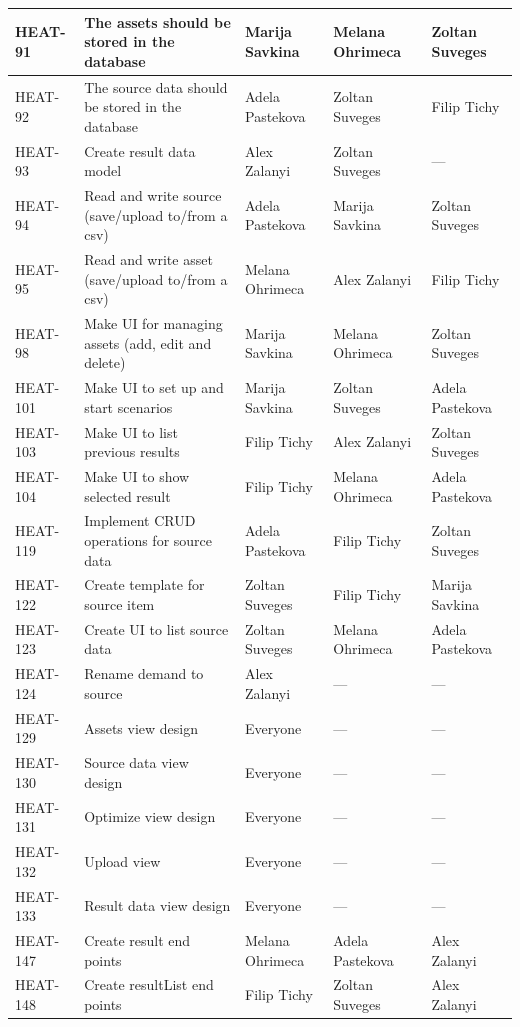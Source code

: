 \begin{longtable}{|p{1.5cm}|p{4.5cm}|p{2.8cm}|p{2.6cm}|p{2.6cm}|}
HEAT-91 & The assets should be stored in the database & Marija Savkina & Melana Ohrimeca & Zoltan Suveges \\ \hline
HEAT-92 & The source data should be stored in the database & Adela Pastekova & Zoltan Suveges & Filip Tichy \\ \hline
HEAT-93 & Create result data model & Alex Zalanyi & Zoltan Suveges & --- \\ \hline
HEAT-94 & Read and write source (save/upload to/from a csv) & Adela Pastekova & Marija Savkina & Zoltan Suveges \\ \hline
HEAT-95 & Read and write asset (save/upload to/from a csv) & Melana Ohrimeca & Alex Zalanyi & Filip Tichy \\ \hline
HEAT-98 & Make UI for managing assets (add, edit and delete) & Marija Savkina & Melana Ohrimeca & Zoltan Suveges \\ \hline
HEAT-101 & Make UI to set up and start scenarios & Marija Savkina & Zoltan Suveges & Adela Pastekova \\ \hline
HEAT-103 & Make UI to list previous results & Filip Tichy & Alex Zalanyi & Zoltan Suveges \\ \hline
HEAT-104 & Make UI to show selected result & Filip Tichy & Melana Ohrimeca & Adela Pastekova \\ \hline
HEAT-119 & Implement CRUD operations for source data & Adela Pastekova & Filip Tichy & Zoltan Suveges \\ \hline
HEAT-122 & Create template for source item & Zoltan Suveges & Filip Tichy & Marija Savkina \\ \hline
HEAT-123 & Create UI to list source data & Zoltan Suveges & Melana Ohrimeca & Adela Pastekova \\ \hline
HEAT-124 & Rename demand to source & Alex Zalanyi & --- & --- \\ \hline
HEAT-129 & Assets view design & Everyone & --- & --- \\ \hline
HEAT-130 & Source data view design & Everyone & --- & --- \\ \hline
HEAT-131 & Optimize view design & Everyone & --- & --- \\ \hline
HEAT-132 & Upload view & Everyone & --- & --- \\ \hline
HEAT-133 & Result data view design & Everyone & --- & --- \\ \hline
HEAT-147 & Create result end points & Melana Ohrimeca & Adela Pastekova & Alex Zalanyi \\ \hline
HEAT-148 & Create resultList end points & Filip Tichy & Zoltan Suveges & Alex Zalanyi \\ \hline

\end{longtable}
